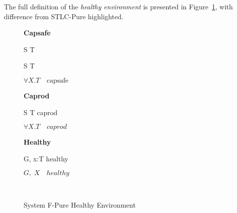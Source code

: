 
The full definition of the \emph{healthy environment} is presented in
Figure~\ref{fig:f-pure-healthy-definition}, with difference from
STLC-Pure highlighted.

\begin{figure}[h]
\begin{framed}

\setlength{\columnseprule}{0.4pt}
\begin{multicols}{2}

\textbf{Capsafe}


{ S \to T \quad {} }

{ S \to T \quad {} }

{ \colorbox{shade}{$\forall X.T \quad \text{capsafe}$} }

\columnbreak

\textbf{Caprod}


{ S \to T \quad caprod }

{ \colorbox{shade}{$\forall X.T \quad caprod$} }

\textbf{Healthy}


{ G, \; x:T \quad healthy }

{ \colorbox{shade}{$G, \; X \quad healthy$} }

\hfill\\

\end{multicols}
\end{framed}

\caption{System F-Pure Healthy Environment}
\label{fig:f-pure-healthy-definition}
\end{figure}

